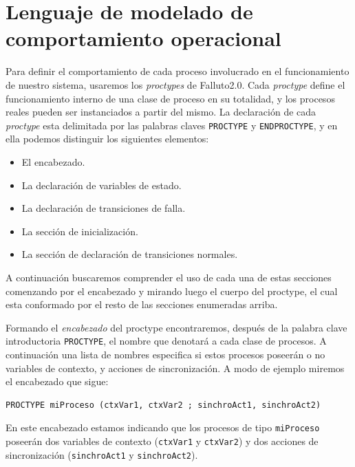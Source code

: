 \documentclass[titlepage, 12pt]{book}
\begin{document}
\section{Lenguaje de modelado de comportamiento operacional}
Para definir el comportamiento de cada proceso involucrado en el funcionamiento de nuestro sistema, usaremos los \textit{proctypes} de Falluto2.0. Cada \textit{proctype} define el funcionamiento interno de una clase de proceso en su totalidad, y los procesos reales pueden ser instanciados a partir del mismo. La declaraci\'on de cada \textit{proctype} esta delimitada por las palabras claves \texttt{PROCTYPE} y \texttt{ENDPROCTYPE}, y en ella podemos distinguir los siguientes elementos:
\begin{itemize}
\item El encabezado.
\item La declaraci\'on de variables de estado.
\item La declaraci\'on de transiciones de falla.
\item La secci\'on de inicializaci\'on.
\item La secci\'on de declaraci\'on de transiciones normales.
\end{itemize} 

A continuaci\'on buscaremos comprender el uso de cada una de estas secciones comenzando por el encabezado y mirando luego el cuerpo del proctype, el cual esta conformado por el resto de las secciones enumeradas arriba.

Formando el \textit{encabezado} del proctype encontraremos, despu\'es de la palabra clave introductoria \texttt{PROCTYPE}, el nombre que denotar\'a a cada clase de procesos. A continuaci\'on una lista de nombres especifica si estos procesos poseer\'an o no variables de contexto, y acciones de sincronizaci\'on. A modo de ejemplo miremos el encabezado que sigue:

\begin{verbatim}
PROCTYPE miProceso (ctxVar1, ctxVar2 ; sinchroAct1, sinchroAct2)
\end{verbatim}

En este encabezado estamos indicando que los procesos de tipo \texttt{miProceso} poseer\'an dos variables de contexto (\texttt{ctxVar1} y \texttt{ctxVar2}) y dos acciones de sincronizaci\'on (\texttt{sinchroAct1} y \texttt{sinchroAct2}).
\end{document}
